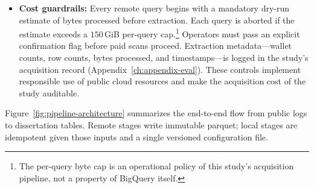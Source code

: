 \begin{itemize}
\item \textbf{Cost guardrails:} Every remote query begins with a mandatory dry-run estimate of bytes processed before extraction. Each query is aborted if the estimate exceeds a $150$\,GiB per-query cap.\footnote{The per-query byte cap is an operational policy of this study's acquisition pipeline, not a property of BigQuery itself.} Operators must pass an explicit confirmation flag before paid scans proceed. Extraction metadata---wallet counts, row counts, bytes processed, and timestamps---is logged in the study's acquisition record (Appendix~\ref{ch:appendix-eval}). These controls implement responsible use of public cloud resources and make the acquisition cost of the study auditable.

\end{itemize}


Figure~\ref{fig:pipeline-architecture} summarizes the end-to-end flow from public logs to dissertation tables. Remote stages write immutable parquet; local stages are idempotent given those inputs and a single versioned configuration file.


